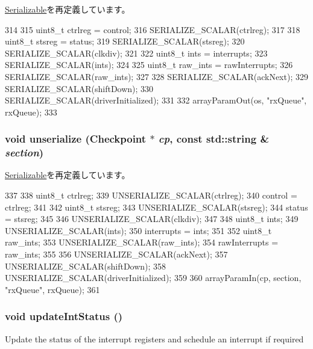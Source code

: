 \hyperlink{classSerializable_ad6272f80ae37e8331e3969b3f072a801}{Serializable}を再定義しています。


\begin{DoxyCode}
314 {
315     uint8_t ctrlreg = control;
316     SERIALIZE_SCALAR(ctrlreg);
317 
318     uint8_t stsreg = status;
319     SERIALIZE_SCALAR(stsreg);
320     SERIALIZE_SCALAR(clkdiv);
321 
322     uint8_t ints = interrupts;
323     SERIALIZE_SCALAR(ints);
324 
325     uint8_t raw_ints = rawInterrupts;
326     SERIALIZE_SCALAR(raw_ints);
327 
328     SERIALIZE_SCALAR(ackNext);
329     SERIALIZE_SCALAR(shiftDown);
330     SERIALIZE_SCALAR(driverInitialized);
331 
332     arrayParamOut(os, "rxQueue", rxQueue);
333 }
\end{DoxyCode}
\hypertarget{classPl050_af22e5d6d660b97db37003ac61ac4ee49}{
\subsubsection[{unserialize}]{\setlength{\rightskip}{0pt plus 5cm}void unserialize ({\bf Checkpoint} $\ast$ {\em cp}, \/  const std::string \& {\em section})}}
\label{classPl050_af22e5d6d660b97db37003ac61ac4ee49}


\hyperlink{classSerializable_af100c4e9feabf3cd918619c88c718387}{Serializable}を再定義しています。


\begin{DoxyCode}
337 {
338     uint8_t ctrlreg;
339     UNSERIALIZE_SCALAR(ctrlreg);
340     control = ctrlreg;
341 
342     uint8_t stsreg;
343     UNSERIALIZE_SCALAR(stsreg);
344     status = stsreg;
345 
346     UNSERIALIZE_SCALAR(clkdiv);
347 
348     uint8_t ints;
349     UNSERIALIZE_SCALAR(ints);
350     interrupts = ints;
351 
352     uint8_t raw_ints;
353     UNSERIALIZE_SCALAR(raw_ints);
354     rawInterrupts = raw_ints;
355 
356     UNSERIALIZE_SCALAR(ackNext);
357     UNSERIALIZE_SCALAR(shiftDown);
358     UNSERIALIZE_SCALAR(driverInitialized);
359 
360     arrayParamIn(cp, section, "rxQueue", rxQueue);
361 }
\end{DoxyCode}
\hypertarget{classPl050_a3923da0a193dd22650c252c4eae4743d}{
\subsubsection[{updateIntStatus}]{\setlength{\rightskip}{0pt plus 5cm}void updateIntStatus ()}}
\label{classPl050_a3923da0a193dd22650c252c4eae4743d}
Update the status of the interrupt registers and schedule an interrupt if required 


